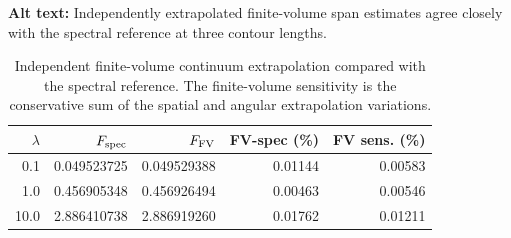 \begin{table}[ht]
\centering
\caption{Independent finite-volume continuum extrapolation compared with the spectral reference.  The finite-volume sensitivity is the conservative sum of the spatial and angular extrapolation variations.}
\par\raggedright\textbf{Alt text:} Independently extrapolated finite-volume span estimates agree closely with the spectral reference at three contour lengths.\par\centering

\label{tab:fv_comparison}
\begin{tabular}{rrrrr}
\toprule
{$\lambda$}&{$F_{\rm spec}$}&{$F_{\rm FV}$}&{FV-spec (\%)}&{FV sens. (\%)}\\
\midrule
0.1 & 0.049523725 & 0.049529388 & 0.01144 & 0.00583\\
1.0 & 0.456905348 & 0.456926494 & 0.00463 & 0.00546\\
10.0 & 2.886410738 & 2.886919260 & 0.01762 & 0.01211\\
\bottomrule
\end{tabular}
\end{table}
